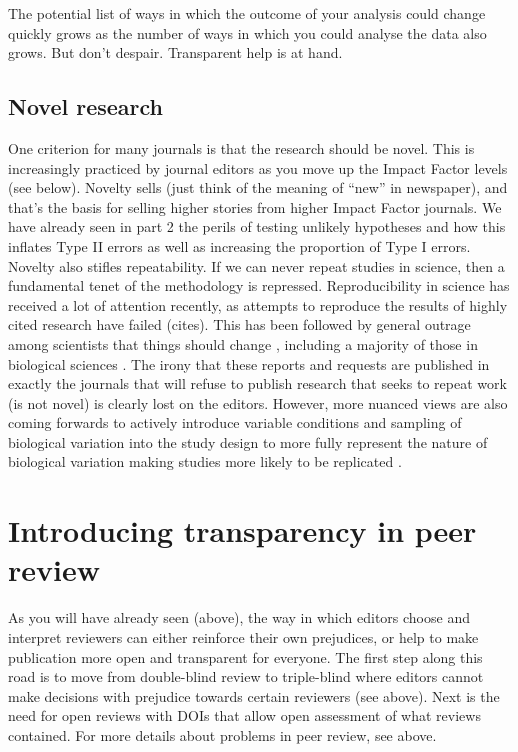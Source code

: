 \documentclass[
]{krantz}
\begin{document}
The potential list of ways in which the outcome of your analysis could change quickly grows as the number of ways in which you could analyse the data also grows. But don't despair. Transparent help is at hand.

\hypertarget{novel-research}{%
\subsection{Novel research}\label{novel-research}}

One criterion for many journals is that the research should be novel. This is increasingly practiced by journal editors as you move up the Impact Factor levels (see below). Novelty sells (just think of the meaning of ``new'' in newspaper), and that's the basis for selling higher stories from higher Impact Factor journals. We have already seen in part 2 the perils of testing unlikely hypotheses and how this inflates Type II errors as well as increasing the proportion of Type I errors. Novelty also stifles repeatability. If we can never repeat studies in science, then a fundamental tenet of the methodology is repressed. Reproducibility in science has received a lot of attention recently, as attempts to reproduce the results of highly cited research have failed (cites). This has been followed by general outrage among scientists that things should change \citep{anderson2007normative, munafo2017manifesto}, including a majority of those in biological sciences \citep{baker20161500}. The irony that these reports and requests are published in exactly the journals that will refuse to publish research that seeks to repeat work (is not novel) is clearly lost on the editors. However, more nuanced views are also coming forwards to actively introduce variable conditions and sampling of biological variation into the study design to more fully represent the nature of biological variation making studies more likely to be replicated \citep{voelkl2020reproducibility}.

\hypertarget{introducing-transparency-in-peer-review}{%
\section{Introducing transparency in peer review}\label{introducing-transparency-in-peer-review}}

As you will have already seen (above), the way in which editors choose and interpret reviewers can either reinforce their own prejudices, or help to make publication more open and transparent for everyone. The first step along this road is to move from double-blind review to triple-blind where editors cannot make decisions with prejudice towards certain reviewers (see above). Next is the need for open reviews with DOIs that allow open assessment of what reviews contained. For more details about problems in peer review, see above.
\end{document}
